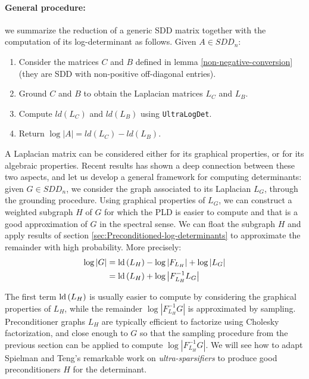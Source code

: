 \paragraph{General procedure:}

we summarize the reduction of a generic SDD matrix together with the
computation of its log-determinant as follows. Given $A\in SDD_{n}$: 
\begin{enumerate}
\item Consider the matrices $C$ and $B$ defined in lemma \ref{non-negative-conversion}
(they are SDD with non-positive off-diagonal entries). 
\item Ground $C$ and $B$ to obtain the Laplacian matrices $L_{C}$ and
$L_{B}$. 
\item Compute $ld(L_{C})$ and $ld(L_{B})$ using \texttt{UltraLogDet}. 
\item Return $\log|A|=ld(L_{C})-ld(L_{B})$. 
\end{enumerate}
A Laplacian matrix can be considered either for its graphical properties,
or for its algebraic properties. Recent results has shown a deep connection
between these two aspects, and let us develop a general framework
for computing determinants: given $G\in SDD_{n}$, we consider the
graph associated to its Laplacian $L_{G}$, through the grounding
procedure. Using graphical properties of $L_{G}$, we can construct
a weighted subgraph $H$ of $G$ for which the PLD is easier to compute
and that is a good approximation of $G$ in the spectral sense. We
can float the subgraph $H$ and apply results of section \ref{sec:Preconditioned-log-determinants}
to approximate the remainder with high probability. More precisely:
\begin{align*}
\log\left|G\right| & =\text{\textnormal{ld}}\left(L_{H}\right)-\log\left|F_{L_{H}}\right|+\log\left|L_{G}\right|\\
 & =\text{\textnormal{ld}}\left(L_{H}\right)+\log\left|F_{L_{H}}^{-1}L_{G}\right|
\end{align*}


The first term $\text{\textnormal{ld}}\left(L_{H}\right)$ is usually easier to compute
by considering the graphical properties of $L_{H}$, while the remainder
$\log\left|F_{L_{H}}^{-1}G\right|$ is approximated by sampling. Preconditioner
graphs $L_{H}$ are typically efficient to factorize using Cholesky
factorization, and close enough to $G$ so that the sampling procedure
from the previous section can be applied to compute $\log\left|F_{L_{H}}^{-1}G\right|$.
We will see how to adapt Spielman and Teng's remarkable work on \emph{ultra-sparsifiers}
to produce good preconditioners $H$ for the determinant.

